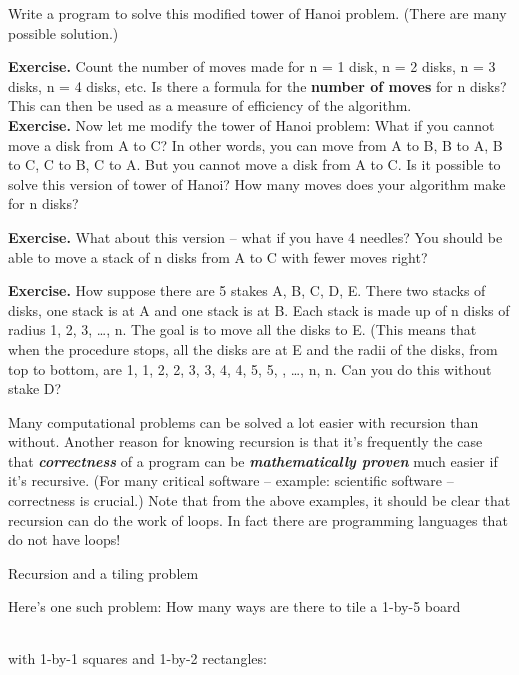 \documentclass[
]{article}
\begin{document}
Write a program to solve this modified tower of Hanoi problem. (There
are many possible solution.)

\textbf{Exercise.} Count the number of moves made for n = 1 disk, n = 2
disks, n = 3 disks, n = 4 disks, etc. Is there a formula for the
\textbf{number of moves} for n disks? This can then be used as a measure
of efficiency of the algorithm.\\

\textbf{Exercise. }Now let me modify the tower of Hanoi problem: What if
you cannot move a disk from A to C? In other words, you can move from A
to B, B to A, B to C, C to B, C to A. But you cannot move a disk from A
to C. Is it possible to solve this version of tower of Hanoi? How many
moves does your algorithm make for n disks?

\textbf{Exercise. }What about this version -- what if you have 4
needles? You should be able to move a stack of n disks from A to C with
fewer moves right?

\textbf{Exercise.} How suppose there are 5 stakes A, B, C, D, E. There
two stacks of disks, one stack is at A and one stack is at B. Each stack
is made up of n disks of radius 1, 2, 3, \ldots, n. The goal is to move
all the disks to E. (This means that when the procedure stops, all the
disks are at E and the radii of the disks, from top to bottom, are 1, 1,
2, 2, 3, 3, 4, 4, 5, 5, , \ldots, n, n. Can you do this without stake D?

Many computational problems can be solved a lot easier with recursion
than without. Another reason for knowing recursion is that it's
frequently the case that \emph{\textbf{correctness}} of a program can be
\emph{\textbf{mathematically proven}} much easier if it's recursive.
(For many critical software -- example: scientific software --
correctness is crucial.) Note that from the above examples, it should be
clear that recursion can do the work of loops. In fact there are
programming languages that do not have loops!

Recursion and a tiling problem

Here's one such problem: How many ways are there to tile a 1-by-5 board

\begin{longtable}[]{@{}lllll@{}}
\toprule
\endhead
& & & &\tabularnewline
\bottomrule
\end{longtable}

with 1-by-1 squares and 1-by-2 rectangles:

\begin{longtable}[]{@{}lllll@{}}
\toprule
\endhead
& & & &\tabularnewline
\bottomrule
\end{longtable}
\end{document}
